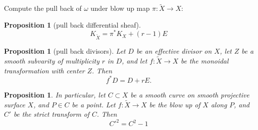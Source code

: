 \documentclass{article}
\newtheorem{prop}[defn]{Proposition}
\begin{document}
Compute the pull back of $\omega$ under blow up map $\pi: \widetilde{X} \to X$:
\begin{prop}[pull back differential sheaf]
	\[
		K_{\widetilde{X}}=\pi^{*}K_{X}+(r-1)E
	\]
\end{prop}

\begin{prop}[pull back divisors]
	Let $D$  be an effective divisor on $X$, let $Z$  be a smooth subvarity of multiplicity $r$  in $D$, and let $f: \widetilde{X}\to X$ be the monoidal transformation with center $Z$. Then
	\[
		f^*D = D + rE.
	\]
\end{prop}

\begin{prop}
	In particular, let $C \subset X$ be a smooth curve on smooth projective surface $X$, and $P\in C$ be a point. Let $f: \widetilde{X}\to X$ be the blow up of $X$ along $P$, and $ C'$ be the strict transform of $C$. Then
	\[
		C'^{2}=C^2-1
	\]

\end{prop}
\end{document}
